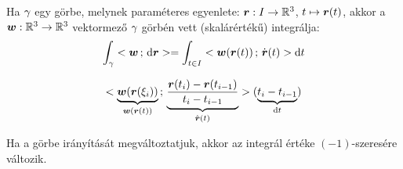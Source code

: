 \documentclass[main.tex]{subfiles}
\begin{document}

Ha ${\gamma}$ egy görbe, melynek paraméteres egyenlete:
$\boldsymbol{r} : I \rightarrow \mathbb{R}^3$, $t \mapsto \boldsymbol{r}(t)$,
akkor a $\boldsymbol{w}: \mathbb{R}^3 \rightarrow \mathbb{R}^3$ vektormező
${\gamma}$ görbén vett (skalárértékű) integrálja:
\begin{equation*}
  \int_{{\gamma}} < \boldsymbol{w} \, ; \, \mathrm{d} \boldsymbol{r} >
  = \int_{t \in I} < 
    \boldsymbol{w}(\boldsymbol{r}(t))
   \, ; \, \dot{\boldsymbol{r}}(t) > \mathrm{d} t
\end{equation*}




\begin{equation*}
  < 
    \underbrace{\boldsymbol{w}(\boldsymbol{r}(\xi_i))}_{
      \boldsymbol{w}(\boldsymbol{r}(t))
    }
   \, ; \, 
    \underbrace{\dfrac{
        \boldsymbol{r}(t_i) - \boldsymbol{r}(t_{i-1})
      }{t_i - t_{i-1}}}_{\dot{\boldsymbol{r}}(t)}
   > (
  \underbrace{t_i - t_{i-1}}_{\mathrm{d} t}
  )
\end{equation*}




Ha a görbe irányítását megváltoztatjuk,
akkor az integrál értéke $(-1)$-szeresére változik.



\pagebreak
\end{document}
